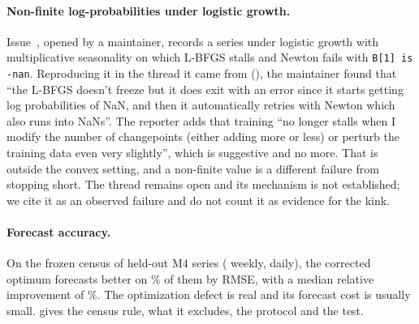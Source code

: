 \paragraph{Non-finite log-probabilities under logistic growth.}
Issue~, opened by a maintainer, records a series under logistic
growth with multiplicative seasonality on which L-BFGS stalls and Newton fails with
\texttt{B[1] is -nan}. Reproducing it in the thread it came from
(), the maintainer found that ``the L-BFGS doesn't freeze but it does
exit with an error since it starts getting log probabilities of NaN, and then it
automatically retries with Newton which also runs into NaNs''. The reporter adds that
training ``no longer stalls when I modify the number of changepoints (either adding more
or less) or perturb the training data even very slightly'', which is suggestive and no
more. That is outside the convex setting, and a non-finite value is a different failure
from stopping short. The thread remains open and its
mechanism is not established; we cite it as an observed failure and do not count
it as evidence for the kink.

\paragraph{Forecast accuracy.}
On the frozen census of \CensusSeries{} held-out M4 series
(\CensusWeekly{} weekly, \CensusDaily{} daily), the corrected optimum forecasts
better on \RmseWinRate\% of them by RMSE, with a median relative improvement of
\RmseAdvantage\%. The optimization defect is real and its forecast cost is
usually small.  gives the census rule, what it excludes, the
protocol and the test.

